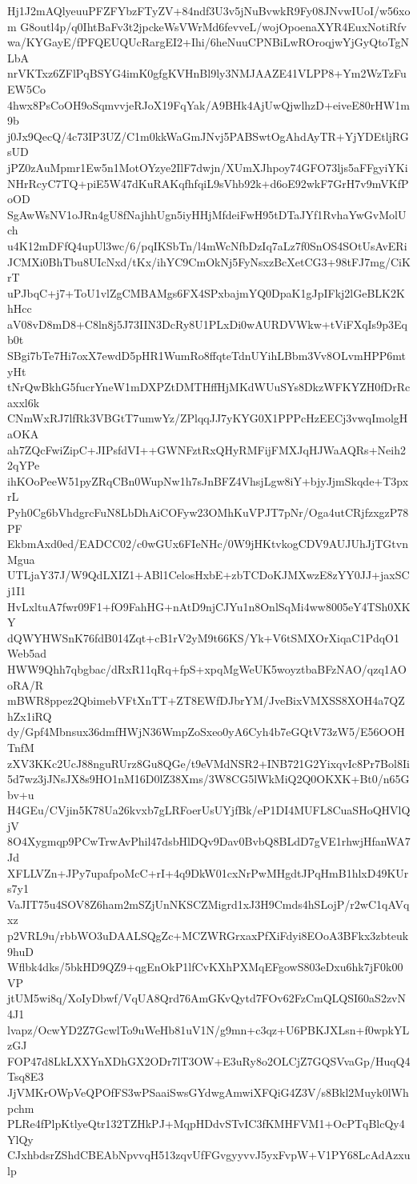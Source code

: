 Hj1J2mAQlyeuuPFZFYbzFTyZV+84ndf3U3v5jNuBvwkR9Fy08JNvwIUoI/w56xom
G8outl4p/q0IhtBaFv3t2jpckeWsVWrMd6fevveL/wojOpoenaXYR4EuxNotiRfv
wa/KYGayE/fPFQEUQUcRargEI2+Ihi/6heNuuCPNBiLwROroqjwYjGyQtoTgNLbA
nrVKTxz6ZFlPqBSYG4imK0gfgKVHnBl9ly3NMJAAZE41VLPP8+Ym2WzTzFuEW5Co
4hwx8PsCoOH9oSqmvvjeRJoX19FqYak/A9BHk4AjUwQjwlhzD+eiveE80rHW1m9b
j0Jx9QecQ/4c73IP3UZ/C1m0kkWaGmJNvj5PABSwtOgAhdAyTR+YjYDEtljRGsUD
jPZ0zAuMpmr1Ew5n1MotOYzye2IlF7dwjn/XUmXJhpoy74GFO73ljs5aFFgyiYKi
NHrRcyC7TQ+piE5W47dKuRAKqfhfqiL9sVhb92k+d6oE92wkF7GrH7v9mVKfPoOD
SgAwWsNV1oJRn4gU8fNajhhUgn5iyHHjMfdeiFwH95tDTaJYf1RvhaYwGvMolUch
u4K12mDFfQ4upUl3wc/6/pqIKSbTn/l4mWcNfbDzIq7aLz7f0SnOS4SOtUsAvERi
JCMXi0BhTbu8UIcNxd/tKx/ihYC9CmOkNj5FyNsxzBcXetCG3+98tFJ7mg/CiKrT
uPJbqC+j7+ToU1vlZgCMBAMgs6FX4SPxbajmYQ0DpaK1gJpIFkj2lGeBLK2KhHcc
aV08vD8mD8+C8ln8j5J73IIN3DcRy8U1PLxDi0wAURDVWkw+tViFXqIs9p3Eqb0t
SBgi7bTe7Hi7oxX7ewdD5pHR1WumRo8ffqteTdnUYihLBbm3Vv8OLvmHPP6mtyHt
tNrQwBkhG5fucrYneW1mDXPZtDMTHffHjMKdWUuSYs8DkzWFKYZH0fDrRcaxxl6k
CNmWxRJ7lfRk3VBGtT7umwYz/ZPlqqJJ7yKYG0X1PPPcHzEECj3vwqImolgHaOKA
ah7ZQcFwiZipC+JIPsfdVI++GWNFztRxQHyRMFijFMXJqHJWaAQRs+Neih22qYPe
ihKOoPeeW51pyZRqCBn0WupNw1h7sJnBFZ4VhsjLgw8iY+bjyJjmSkqde+T3pxrL
Pyh0Cg6bVhdgrcFuN8LbDhAiCOFyw23OMhKuVPJT7pNr/Oga4utCRjfzxgzP78PF
EkbmAxd0ed/EADCC02/c0wGUx6FIeNHc/0W9jHKtvkogCDV9AUJUhJjTGtvnMgua
UTLjaY37J/W9QdLXIZ1+ABl1CelosHxbE+zbTCDoKJMXwzE8zYY0JJ+jaxSCj1I1
HvLxltuA7fwr09F1+fO9FahHG+nAtD9njCJYu1n8OnlSqMi4ww8005eY4TSh0XKY
dQWYHWSnK76fdB014Zqt+cB1rV2yM9t66KS/Yk+V6tSMXOrXiqaC1PdqO1Web5ad
HWW9Qhh7qbgbac/dRxR11qRq+fpS+xpqMgWeUK5woyztbaBFzNAO/qzq1AOoRA/R
mBWR8ppez2QbimebVFtXnTT+ZT8EWfDJbrYM/JveBixVMXSS8XOH4a7QZhZx1iRQ
dy/Gpf4Mbnsux36dmfHWjN36WmpZoSxeo0yA6Cyh4b7eGQtV73zW5/E56OOHTnfM
zXV3KKc2UcJ88nguRUrz8Gu8QGe/t9eVMdNSR2+INB721G2YixqvIc8Pr7Bol8Ii
5d7wz3jJNsJX8s9HO1nM16D0lZ38Xms/3W8CG5lWkMiQ2Q0OKXK+Bt0/n65Gbv+u
H4GEu/CVjin5K78Ua26kvxb7gLRFoerUsUYjfBk/eP1DI4MUFL8CuaSHoQHVlQjV
8O4Xygmqp9PCwTrwAvPhil47dsbHlDQv9Dav0BvbQ8BLdD7gVE1rhwjHfanWA7Jd
XFLLVZn+JPy7upafpoMcC+rI+4q9DkW01cxNrPwMHgdtJPqHmB1hlxD49KUrs7y1
VaJIT75u4SOV8Z6ham2mSZjUnNKSCZMigrd1xJ3H9Cmds4hSLojP/r2wC1qAVqxz
p2VRL9u/rbbWO3uDAALSQgZc+MCZWRGrxaxPfXiFdyi8EOoA3BFkx3zbteuk9huD
Wflbk4dks/5bkHD9QZ9+qgEnOkP1lfCvKXhPXMqEFgowS803eDxu6hk7jF0k00VP
jtUM5wi8q/XoIyDbwf/VqUA8Qrd76AmGKvQytd7FOv62FzCmQLQSI60aS2zvN4J1
lvapz/OcwYD2Z7GcwlTo9uWeHb81uV1N/g9mn+c3qz+U6PBKJXLsn+f0wpkYLzGJ
FOP47d8LkLXXYnXDhGX2ODr7lT3OW+E3uRy8o2OLCjZ7GQSVvaGp/HuqQ4Tsq8E3
JjVMKrOWpVeQPOfFS3wPSaaiSwsGYdwgAmwiXFQiG4Z3V/s8Bkl2Muyk0lWhpchm
PLRe4fPlpKtlyeQtr132TZHkPJ+MqpHDdvSTvIC3fKMHFVM1+OcPTqBlcQy4YlQy
CJxhbdsrZShdCBEAbNpvvqH513zqvUfFGvgyyvvJ5yxFvpW+V1PY68LcAdAzxulp
